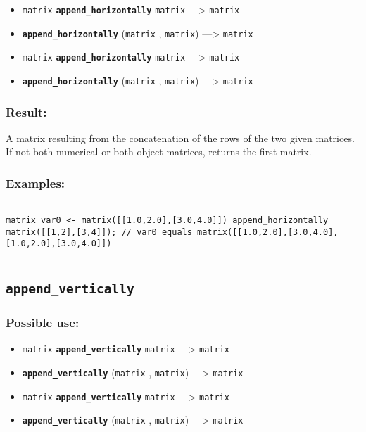 \documentclass[]{book}
\providecommand{\tightlist}{%
  \setlength{\itemsep}{0pt}\setlength{\parskip}{0pt}}
\theoremstyle{definition}
\theoremstyle{definition}
\theoremstyle{definition}
\theoremstyle{remark}
\begin{document}
\begin{itemize}
\tightlist
\item
  \texttt{matrix} \textbf{\texttt{append\_horizontally}} \texttt{matrix}
  ---\textgreater{} \texttt{matrix}
\item
  \textbf{\texttt{append\_horizontally}} (\texttt{matrix} ,
  \texttt{matrix}) ---\textgreater{} \texttt{matrix}
\item
  \texttt{matrix} \textbf{\texttt{append\_horizontally}} \texttt{matrix}
  ---\textgreater{} \texttt{matrix}
\item
  \textbf{\texttt{append\_horizontally}} (\texttt{matrix} ,
  \texttt{matrix}) ---\textgreater{} \texttt{matrix}
\end{itemize}

\subsubsection{Result:}\label{result-38}

A matrix resulting from the concatenation of the rows of the two given
matrices. If not both numerical or both object matrices, returns the
first matrix.

\subsubsection{Examples:}\label{examples-31}

\begin{verbatim}
 
matrix var0 <- matrix([[1.0,2.0],[3.0,4.0]]) append_horizontally matrix([[1,2],[3,4]]); // var0 equals matrix([[1.0,2.0],[3.0,4.0],[1.0,2.0],[3.0,4.0]])
\end{verbatim}

\begin{center}\rule{0.5\linewidth}{\linethickness}\end{center}

\subsection{\texorpdfstring{\texttt{append\_vertically}}{append\_vertically}}\label{append_vertically}

\subsubsection{Possible use:}\label{possible-use-40}

\begin{itemize}
\tightlist
\item
  \texttt{matrix} \textbf{\texttt{append\_vertically}} \texttt{matrix}
  ---\textgreater{} \texttt{matrix}
\item
  \textbf{\texttt{append\_vertically}} (\texttt{matrix} ,
  \texttt{matrix}) ---\textgreater{} \texttt{matrix}
\item
  \texttt{matrix} \textbf{\texttt{append\_vertically}} \texttt{matrix}
  ---\textgreater{} \texttt{matrix}
\item
  \textbf{\texttt{append\_vertically}} (\texttt{matrix} ,
  \texttt{matrix}) ---\textgreater{} \texttt{matrix}
\end{itemize}
\end{document}
